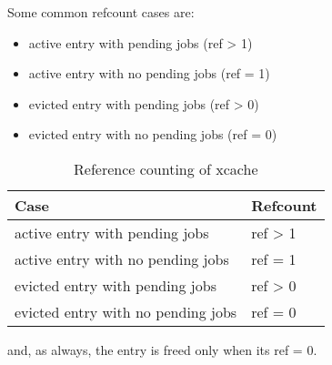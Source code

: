 Some common refcount cases are:

\begin{itemize}
	\item active entry with pending jobs (ref > 1)
	\item active entry with no pending jobs (ref = 1)
	\item evicted entry with pending jobs (ref > 0)
	\item evicted entry with no pending jobs (ref = 0)
\end{itemize}

\begin{table}[tbp]
	\centering
	\begin{tabular}{ | l | l | }
		\hline
		Case & Refcount \\ \hline \hline
		active entry with pending jobs & ref > 1 \\ \hline
		active entry with no pending jobs & ref = 1 \\ \hline
		evicted entry with pending jobs & ref > 0 \\ \hline
		evicted entry with no pending jobs & ref = 0 \\ \hline
	\end{tabular}
	\caption{Reference counting of xcache}
	\label{tab:refcount}
\end{table}

and, as always, the entry is freed only when its ref = 0.

